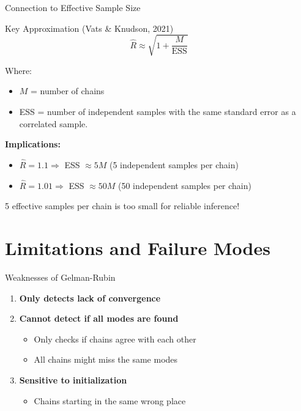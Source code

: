 \begin{frame}{Connection to Effective Sample Size}
	\begin{block}{Key Approximation (Vats \& Knudson, 2021)}
		$$\hat{R} \approx \sqrt{1 + \frac{M}{\text{ESS}}}$$
	\end{block}

	Where:
	\begin{itemize}
		\item $M$ = number of chains
		\item ESS = number of independent samples with the same standard error as a correlated sample.
	\end{itemize}

	\vspace{0.2cm}
	\textbf{Implications:}
	\begin{itemize}
		\item $\hat{R} = 1.1 \Rightarrow$ ESS $\approx 5M$ (5 independent samples per chain)
		\item $\hat{R} = 1.01 \Rightarrow$ ESS $\approx 50M$ (50 independent samples per chain)
	\end{itemize}

	\vspace{0.2cm}
	\begin{center}
		\color{copenhagenred} 5 effective samples per chain is too small for reliable inference!
	\end{center}
\end{frame}

\section{Limitations and Failure Modes}

\begin{frame}{Weaknesses of Gelman-Rubin}
	\begin{enumerate}
		\item \textbf{Only detects lack of convergence}
		\item \textbf{Cannot detect if all modes are found}
		      \begin{itemize}
			      \item Only checks if chains agree with each other
			      \item All chains might miss the same modes
		      \end{itemize}

		\item \textbf{Sensitive to initialization}
		      \begin{itemize}
			      \item Chains starting in the same wrong place
		      \end{itemize}
	\end{enumerate}
\end{frame}

